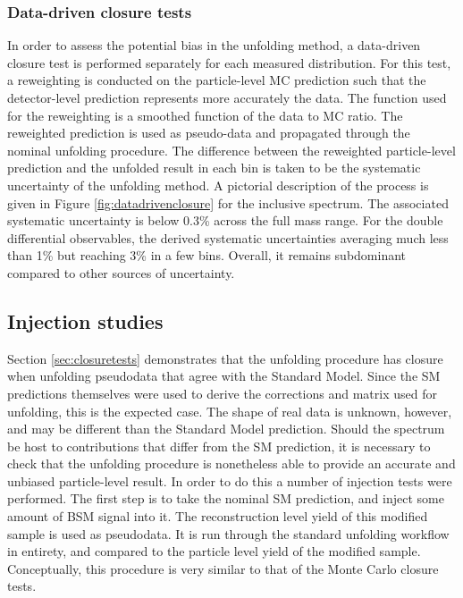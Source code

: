 \subsubsection{Data-driven closure tests}
\label{sssec:datadrivenclosure}
In order to assess the potential bias in the unfolding method, a data-driven closure test is performed separately for each measured distribution. For this test, a reweighting is conducted on the particle-level MC prediction such that the detector-level prediction represents more accurately the data. The function used for the reweighting is a smoothed function of the data to MC ratio. The reweighted prediction is used as pseudo-data and propagated through the nominal unfolding procedure. The difference between the reweighted particle-level prediction and the unfolded result in each bin is taken to be the systematic uncertainty of the unfolding method. A pictorial description of the process is given in Figure \ref{fig:datadrivenclosure} for the inclusive \mFourL spectrum. The associated systematic uncertainty is below 0.3\% across the full mass range. For the double differential observables, the derived systematic uncertainties averaging much less than 1\% but reaching 3\% in a few bins. Overall, it remains subdominant compared to other sources of uncertainty.


\subsection{Injection studies}
\label{ssec:injectiontests}
Section \ref{sec:closuretests} demonstrates that the unfolding procedure has closure when unfolding pseudodata that agree with the Standard Model. Since the SM predictions themselves were used to derive the corrections and matrix used for unfolding, this is the expected case. The shape of real data is unknown, however, and may be different than the Standard Model prediction. Should the \mFourL spectrum be host to contributions that differ from the SM prediction, it is necessary to check that the unfolding procedure is nonetheless able to provide an accurate and unbiased particle-level result. In order to do this a number of injection tests were performed. The first step is to take the nominal SM prediction, and inject some amount of BSM signal into it. The reconstruction level yield of this modified sample is used as pseudodata. It is run through the standard unfolding workflow in entirety, and compared to the particle level yield of the modified sample. Conceptually, this procedure is very similar to that of the Monte Carlo closure tests. 


